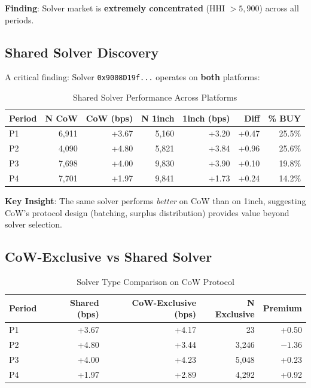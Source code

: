\documentclass[11pt,a4paper]{article}
\begin{document}
\textbf{Finding}: Solver market is \textbf{extremely concentrated} (HHI $> 5,900$) across all periods.

\subsection{Shared Solver Discovery}

A critical finding: Solver \texttt{0x9008D19f...} operates on \textbf{both} platforms:

\begin{table}[H]
\centering
\caption{Shared Solver Performance Across Platforms}
\begin{tabular}{lrrrrrr}
\toprule
\textbf{Period} & \textbf{N CoW} & \textbf{CoW (bps)} & \textbf{N 1inch} & \textbf{1inch (bps)} & \textbf{Diff} & \textbf{\% BUY} \\
\midrule
P1 & 6,911 & +3.67 & 5,160 & +3.20 & +0.47 & 25.5\% \\
P2 & 4,090 & +4.80 & 5,821 & +3.84 & +0.96 & 25.6\% \\
P3 & 7,698 & +4.00 & 9,830 & +3.90 & +0.10 & 19.8\% \\
P4 & 7,701 & +1.97 & 9,841 & +1.73 & +0.24 & 14.2\% \\
\bottomrule
\end{tabular}
\end{table}

\textbf{Key Insight}: The same solver performs \textit{better} on CoW than on 1inch, suggesting CoW's protocol design (batching, surplus distribution) provides value beyond solver selection.

\subsection{CoW-Exclusive vs Shared Solver}

\begin{table}[H]
\centering
\caption{Solver Type Comparison on CoW Protocol}
\begin{tabular}{lrrrr}
\toprule
\textbf{Period} & \textbf{Shared (bps)} & \textbf{CoW-Exclusive (bps)} & \textbf{N Exclusive} & \textbf{Premium} \\
\midrule
P1 & +3.67 & +4.17 & 23 & +0.50 \\
P2 & +4.80 & +3.44 & 3,246 & $-1.36$ \\
P3 & +4.00 & +4.23 & 5,048 & +0.23 \\
P4 & +1.97 & +2.89 & 4,292 & +0.92 \\
\bottomrule
\end{tabular}
\end{table}
\end{document}
